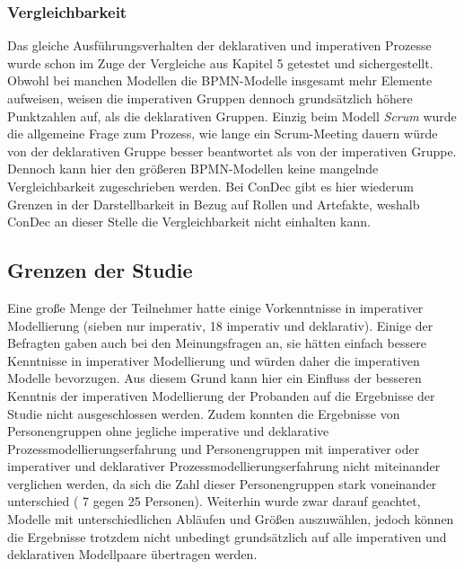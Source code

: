 \subsubsection{Vergleichbarkeit}
Das gleiche Ausführungsverhalten der deklarativen und imperativen Prozesse wurde schon im Zuge der Vergleiche aus Kapitel 5 getestet und sichergestellt. \newline
Obwohl bei manchen Modellen die BPMN-Modelle insgesamt mehr Elemente aufweisen, weisen die imperativen Gruppen dennoch grundsätzlich höhere Punktzahlen auf, als die deklarativen Gruppen. Einzig beim Modell \textit{Scrum} wurde die allgemeine Frage zum Prozess, wie lange ein Scrum-Meeting dauern würde von der deklarativen Gruppe besser beantwortet als von der imperativen Gruppe. Dennoch kann hier den größeren BPMN-Modellen keine mangelnde Vergleichbarkeit zugeschrieben werden.\newline
Bei ConDec gibt es hier wiederum Grenzen in der Darstellbarkeit in Bezug auf Rollen und Artefakte, weshalb ConDec an dieser Stelle die Vergleichbarkeit nicht einhalten kann.\newline



\subsection{Grenzen der Studie}

Eine große Menge der Teilnehmer hatte einige Vorkenntnisse in imperativer Modellierung (sieben nur imperativ, 18 imperativ und deklarativ). Einige der Befragten gaben auch bei den Meinungsfragen an, sie hätten einfach bessere Kenntnisse in imperativer Modellierung und würden daher die imperativen Modelle bevorzugen. Aus diesem Grund kann hier ein Einfluss der besseren Kenntnis der imperativen Modellierung der Probanden auf die Ergebnisse der Studie nicht ausgeschlossen werden. \newline 
Zudem konnten die Ergebnisse von Personengruppen ohne jegliche imperative und deklarative Prozessmodellierungserfahrung und Personengruppen mit imperativer oder imperativer und deklarativer Prozessmodellierungserfahrung nicht miteinander verglichen werden, da sich die Zahl dieser Personengruppen stark voneinander unterschied ( 7 gegen 25 Personen).\newline
Weiterhin wurde zwar darauf geachtet, Modelle mit unterschiedlichen Abläufen und Größen auszuwählen, jedoch können die Ergebnisse trotzdem nicht unbedingt grundsätzlich auf alle imperativen und deklarativen Modellpaare übertragen werden. \newline

 










